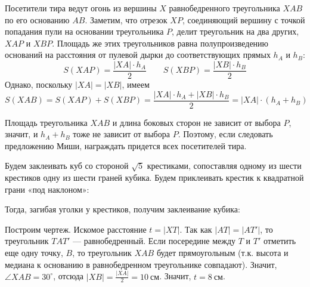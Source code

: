 ﻿
\begin{itemize}
\itA Посетители тира ведут огонь из вершины $X$ равнобедренного треугольника $XAB$ по его основанию
$AB$. Заметим, что отрезок $XP$, соединяющий вершину с точкой попадания пули на основании 
треугольника $P$,
делит треугольник на два других, $XAP$ и $XBP$. Площадь же этих треугольников равна полупроизведению 
оснований на расстояния от пулевой дырки до соответствующих прямых $h_A$ и $h_B$: 
$$S(XAP) = \frac{|XA|\cdot h_A}{2}\quad\quad
S(XBP) = \frac{|XB|\cdot h_B}{2}$$ 
Однако, поскольку $|XA|=|XB|$, имеем
$$S(XAB) = S(XAP) + S(XBP) = \frac{|XA|\cdot h_A + |XB|\cdot h_B}{2} = |XA|\cdot (h_A + h_B)$$

Площадь треугольника $XAB$ и длина боковых сторон не зависит от выбора $P$, значит, и $h_A + h_B$
тоже не зависит от выбора $P$. Поэтому, если следовать предложению Миши, награждать придется
всех посетителей тира.

\itB Будем заклеивать куб со стороной $\sqrt 5$ крестиками, сопоставляя одному из шести крестиков 
одну из шести граней кубика. Будем приклеивать крестик к квадратной грани «под наклоном»:

\begin{center}
\end{center}

Тогда, загибая уголки у крестиков, получим заклеивание кубика:

\begin{center}
\end{center}

\itC Построим чертеж. Искомое расстояние $t = |XT|$. Так как $|AT| = |AT'|$, то треугольник $TAT'$ --- 
равнобедренный. Если посередине между $T$ и $T'$ отметить еще одну точку,
$B$, то треугольник $XAB$ будет прямоугольным (т.к. высота и медиана к основанию в равнобедренном треугольнике 
совпадают). Значит, $\angle XAB = 30^\circ$, отсюда $|XB| = \frac{|XA|}{2} = \SI{10}{\text{см}}$.
Значит, $t = \SI{8}{\textrm{см}}$.


\end{itemize}
